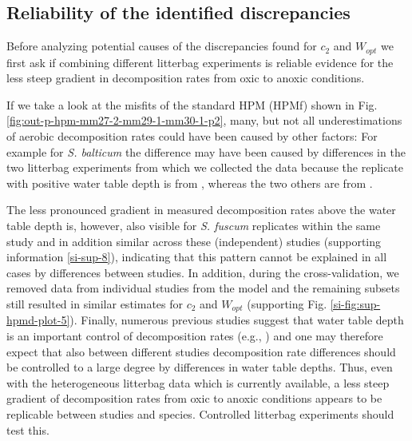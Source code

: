 \documentclass[esd, manuscript]{copernicus}
\begin{document}
\hypertarget{out-discussion-3}{%
\subsection{Reliability of the identified discrepancies}\label{out-discussion-3}}

Before analyzing potential causes of the discrepancies found for \(c_2\) and \(W_{opt}\) we first ask if combining different litterbag experiments is reliable evidence for the less steep gradient in decomposition rates from oxic to anoxic conditions.

If we take a look at the misfits of the standard HPM (HPMf) shown in Fig. \ref{fig:out-p-hpm-mm27-2-mm29-1-mm30-1-p2}, many, but not all underestimations of aerobic decomposition rates could have been caused by other factors: For example for \emph{S. balticum} the difference may have been caused by differences in the two litterbag experiments from which we collected the data because the replicate with positive water table depth is from \citet{Strakova.2010}, whereas the two others are from \citet{Makila.2018}.

The less pronounced gradient in measured decomposition rates above the water table depth is, however, also visible for \emph{S. fuscum} replicates within the same study \citep{Johnson.1991, Golovatskaya.2017, Makila.2018} and in addition similar across these (independent) studies (supporting information \ref{si-sup-8}), indicating that this pattern cannot be explained in all cases by differences between studies. In addition, during the cross-validation, we removed data from individual studies from the model and the remaining subsets still resulted in similar estimates for \(c_2\) and \(W_{opt}\) (supporting Fig. \ref{si-fig:sup-hpmd-plot-5}). Finally, numerous previous studies suggest that water table depth is an important control of decomposition rates (e.g., \citet{Blodau.2004}) and one may therefore expect that also between different studies decomposition rate differences should be controlled to a large degree by differences in water table depths. Thus, even with the heterogeneous litterbag data which is currently available, a less steep gradient of decomposition rates from oxic to anoxic conditions appears to be replicable between studies and species. Controlled litterbag experiments should test this.
\end{document}
